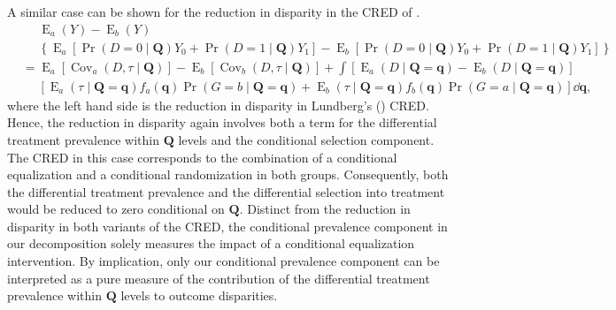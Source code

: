 \documentclass[12pt,a4paper]{article}
\newcommand{\Cov}{\operatorname{Cov}}
\newcommand{\E}{\operatorname{E}}
\def\Q{{\boldsymbol Q}}
\def\q{{\boldsymbol q}}
\DeclareMathOperator{\Pro}{Pr}
\begin{document}
A similar case can be shown for the reduction in disparity in the CRED of \citet{lundberg_gap-closing_2022}.
\begin{align}
&\phantom{{}={}} \E_a(Y)-\E_b(Y) \nonumber \\ 
&\phantom{{}={}} \left\lbrace \E_a[\Pro(D=0 \mid \Q) Y_0 + \Pro(D=1 \mid \Q) Y_1] - \E_b[\Pro(D=0 \mid \Q) Y_0 + \Pro(D=1 \mid \Q) Y_1] \right\rbrace \nonumber \\
&= \E_a[\Cov_a(D,\tau \mid \Q)] - \E_b[\Cov_b(D,\tau \mid \Q)] + \int [\E_a(D \mid \Q=\q) - \E_b(D \mid \Q=\q)] \nonumber \\
&\phantom{{}={}} [\E_a(\tau \mid \Q=\q)f_a(\q)\Pro(G=b \mid \Q=\q) + \E_b(\tau \mid \Q=\q)f_b(\q)\Pro(G=a \mid \Q=\q)] \dd \q,
\end{align}
where the left hand side is the reduction in disparity in Lundberg's (\citeyear{lundberg_gap-closing_2022}) CRED. Hence, the reduction in disparity again involves both a term for the differential treatment prevalence within $\Q$ levels and the conditional selection component. The CRED in this case corresponds to the combination of a conditional equalization and a conditional randomization in both groups. Consequently, both the differential treatment prevalence and the differential selection into treatment would be reduced to zero conditional on $\Q$. Distinct from the reduction in disparity in both variants of the CRED, the conditional prevalence component in our decomposition solely measures the impact of a conditional equalization intervention. By implication, only our conditional prevalence component can be interpreted as a pure measure of the contribution of the differential treatment prevalence within $\Q$ levels to  outcome disparities. 
\end{document}
